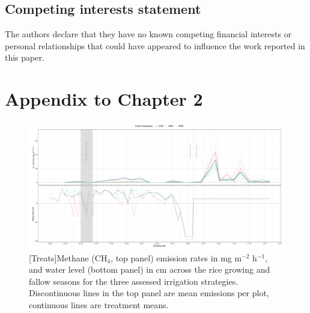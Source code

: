 \subsection*{Competing interests statement}
\label{sec:interests}

The authors declare that they have no known competing financial interests or personal relationships that could have appeared to influence the work reported in this paper.

 
%

\pagebreak

%

\newcommand{\appendixBtables}{
  \renewcommand{\thetable}{B.\arabic{table}}
  \setcounter{table}{0}
}

\section{Appendix to Chapter 2}
\renewcommand{\thefigure}{B.\arabic{figure}}
\setcounter{figure}{0}

\appendixBtables  %


\begin{figure}[htbp]
\captionsetup{justification=justified}
	\centering 
	\includegraphics[scale=0.35, center]{Figures/Chapter_2/CH4_flux_water.pdf}
	[Treats]{Methane (CH$_{4}$, top panel) emission rates in mg m$^{-2}$ h$^{-1}$, and water level (bottom panel) in cm across the rice growing and fallow seasons for the three assessed irrigation strategies. Discontinuous lines in the top panel are mean emissions per plot, continuous lines are treatment means.}     \label{CH4_plot}
\end{figure}

